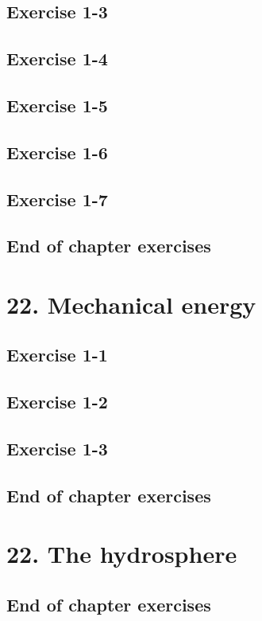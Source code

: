 \subsection{Exercise 1-3}
\subsection{Exercise 1-4}
\subsection{Exercise 1-5}
\subsection{Exercise 1-6}
\subsection{Exercise 1-7}
\subsection{End of chapter exercises}
\section{22. Mechanical energy}
\subsection{Exercise 1-1}
\subsection{Exercise 1-2}
\subsection{Exercise 1-3}
\subsection{End of chapter exercises}
\section{22. The hydrosphere}
\subsection{End of chapter exercises}